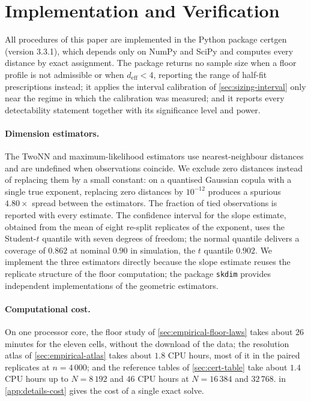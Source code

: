 \documentclass[twoside,11pt]{article}
\theoremstyle{plain}
\theoremstyle{definition}
\theoremstyle{remark}
\newcommand{\deff}{\ensuremath{d_{\mathrm{eff}}}}
\newcommand{\certgen}{\textsf{certgen}}
\begin{document}
\section{Implementation and Verification}\label{sec:implementation}

All procedures of this paper are implemented in the Python package
\certgen{} (version 3.3.1), which depends only on NumPy \citep{harris2020} and SciPy
\citep{virtanen2020} and
computes every distance by exact assignment. The package returns no sample
size when a floor profile is not admissible or when $\deff < 4$, reporting
the range of half-fit prescriptions instead; it applies the interval
calibration of \cref{sec:sizing-interval} only near the regime in which the
calibration was measured; and it reports every detectability statement
together with its significance level and power.

\paragraph{Dimension estimators.} The TwoNN and maximum-likelihood
estimators use nearest-neighbour distances and are undefined when
observations coincide. We exclude zero distances instead of replacing them
by a small constant: on a quantised Gaussian copula with a single true
exponent, replacing zero distances by $10^{-12}$ produces a spurious
$4.80\times$ spread between the estimators. The fraction of tied
observations is reported with every estimate. The confidence interval for
the slope estimate, obtained from the mean of eight re-split replicates of
the exponent, uses the Student-$t$ quantile with seven degrees of freedom;
the normal quantile delivers a coverage of $0.862$ at nominal $0.90$ in
simulation, the $t$ quantile $0.902$. We implement the three estimators
directly because the slope estimate reuses the replicate structure of the
floor computation; the package \texttt{skdim} \citep{bac2021} provides
independent implementations of the geometric estimators.

\paragraph{Computational cost.} On one processor core, the floor study of
\cref{sec:empirical-floor-laws} takes about $26$ minutes for the eleven
cells, without the download of the data; the resolution atlas of
\cref{sec:empirical-atlas} takes about $1.8$ CPU hours, most of it in the
paired replicates at $n = 4\,000$; and the reference tables of
\cref{sec:cert-table} take about $1.4$ CPU hours up to $N = 8\,192$ and
$46$ CPU hours at $N = 16\,384$ and $32\,768$.
 in \cref{app:details-cost} gives the cost of a single exact
solve.
\end{document}

